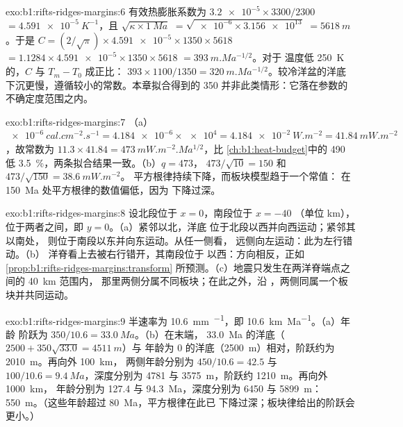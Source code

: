\begin{solution}{exo:b1:rifts-ridges-margins:6}
有效热膨胀系数为
$\num{3.2e-5}\times3300/2300$ $= \qty{4.591e-5}{K^{-1}}$，且
$\sqrt{\kappa\times\qty{1}{Ma}}$ $= \sqrt{\num{e-6}\times\num{3.156e13}}$ $=
\qty{5618}{m}$。于是 $C = (2/\sqrt\pi)\times\num{4.591e-5}\times1350\times5618$ $=
1.1284\times\num{4.591e-5}\times1350\times5618$ $= \qty{393}{m.Ma^{-1/2}}$。对于
温度低 \qty{250}{K} 的，$C$ 与 $T_m - T_0$ 成正比：
$393\times1100/1350 = \qty{320}{m.Ma^{-1/2}}$。较冷洋盆的洋底
下沉更慢，遵循较小的常数。本章拟合得到的 \num{350}
并非此类情形：它落在参数的不确定度范围之内。
\end{solution}

\begin{solution}{exo:b1:rifts-ridges-margins:7}
（a）$\qty{e-6}{cal.cm^{-2}.s^{-1}} = \num{4.184e-6}\times\num{e4} =
\qty{4.184e-2}{W.m^{-2}} = \qty{41.84}{mW.m^{-2}}$，故常数为
$11.3\times41.84 = \qty{473}{mW.m^{-2}.Ma^{1/2}}$，比
\cref{ch:b1:heat-budget}中的 490 低 \qty{3.5}{\percent}，两条拟合结果一致。（b）$q = 473$，
$473/\sqrt{10} = 150$ 和 $473/\sqrt{150} = \qty{38.6}{mW.m^{-2}}$。
平方根律持续下降，而板块模型趋于一个常值：
在 \qty{150}{Ma} 处平方根律的数值偏低，因为
下降过深。
\end{solution}

\begin{solution}{exo:b1:rifts-ridges-margins:8}
设北段位于 $x = 0$，南段位于 $x = -40$
（单位 km），位于两者之间，即 $y = 0$。（a）紧邻以北，洋底
位于北段以西并向西运动；紧邻其以南处，
则位于南段以东并向东运动。从任一侧看，
远侧向左运动：此为左行错动。（b）
洋脊看上去被右行错开，其南段位于
以西：方向相反，正如\cref{prop:b1:rifts-ridges-margins:transform}
所预测。（c）地震只发生在两洋脊端点之间的 \qty{40}{km} 范围内，
那里两侧分属不同板块；在此之外，沿
，两侧同属一个板块并共同运动。
\end{solution}

\begin{solution}{exo:b1:rifts-ridges-margins:9}
半速率为 \qty{10.6}{mm.^{-1}}，即 \qty{10.6}{km.Ma^{-1}}。（a）年龄
阶跃为 $350/10.6 = \qty{33.0}{Ma}$。（b）在末端，
\qty{33.0}{Ma} 的洋底（$2500 + 350\sqrt{33.0} = \qty{4511}{m}$）与
年龄为 0 的洋底（\qty{2500}{m}）相对，阶跃约为 \qty{2010}{m}。再向外 \qty{100}{km}，
两侧年龄分别为 $450/10.6 = 42.5$ 与 $100/10.6 = \qty{9.4}{Ma}$，深度分别为
4781 与 \qty{3575}{m}，阶跃约 \qty{1210}{m}。再向外 \qty{1000}{km}，
年龄分别为 127.4 与 \qty{94.3}{Ma}，深度分别为 6450 与 \qty{5899}{m}：
\qty{550}{m}。（这些年龄超过 \qty{80}{Ma}，平方根律在此已
下降过深；板块律给出的阶跃会更小。）
\end{solution}

